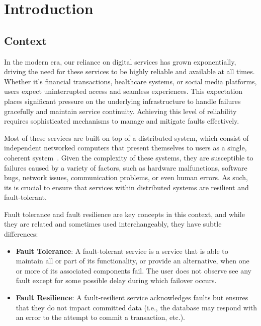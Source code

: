 \chapter{Introduction}\label{ch:introduction}


\section{Context}\label{sec:context}

In the modern era, our reliance on digital services has grown exponentially, driving the need for these services to be highly reliable and available at all times. Whether it's financial transactions, healthcare systems, or social media platforms, users expect uninterrupted access and seamless experiences. This expectation places significant pressure on the underlying infrastructure to handle failures gracefully and maintain service continuity. Achieving this level of reliability requires sophisticated mechanisms to manage and mitigate faults effectively.

Most of these services are built on top of a distributed system,
which consist of independent networked computers that present themselves to users as a single,
coherent system~\cite{fcc-distributed-systems}. Given the complexity of these systems, they are susceptible to failures caused by a variety of factors, such as hardware malfunctions, software bugs, network issues, communication problems, or even human errors. As such, its is crucial to ensure that services within distributed systems are resilient and fault-tolerant.

Fault tolerance and fault resilience are key concepts in this context, and while they are related and sometimes used interchangeably, they have subtle differences:

\begin{itemize}
    \item {\textbf{Fault Tolerance}}:
    A fault-tolerant service is a service that is able to maintain all or part of its functionality,
    or provide an alternative, when one or more of its associated components fail.
    The user does not observe see any fault except for some possible delay during which failover occurs.
    \item {\textbf{Fault Resilience}}: A fault-resilient service acknowledges faults but ensures that they do not impact committed data (i.e., the database may respond with an error to the attempt to commit a transaction, etc.).
\end{itemize}

